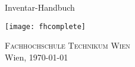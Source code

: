%
%

\begin{titlepage}
\begin{center}
\vspace*{40mm} \huge Inventar-Handbuch\\
\vspace*{10mm}
\large 

\vfill \texttt{[image: fhcomplete]}
	
\vfill \textsc{Fachhochschule Technikum Wien}\\

Wien, \today
\end{center}
\end{titlepage}
